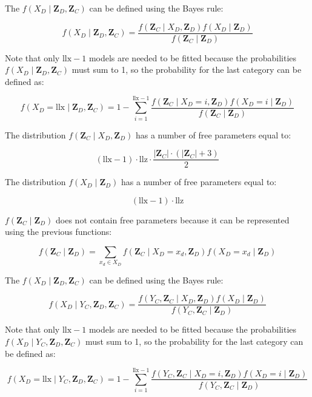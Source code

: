 \documentclass[12pt]{article}
\newcommand{\zd}{\mathbf{Z}_D}
\newcommand{\zc}{\mathbf{Z}_C}
\newcommand{\z}{\mathbf{Z}_D, \mathbf{Z}_C}
\begin{document}
The $f(X_D\mid \z)$ can be defined using the Bayes rule:

\begin{equation}
f(X_D\mid\z) = \frac{f(\zc\mid X_D, \zd)f(X_D\mid \zd)}{f(\zc\mid\zd)}
\end{equation}

Note that only $\text{llx} - 1$ models are needed to be fitted because the probabilities $f(X_D \mid \z)$ must sum to 1, so the probability for the last category can be defined as:

\begin{equation}
f(X_D = \text{llx}\mid \z) = 1 - \sum\limits_{i = 1}^{\text{llx} - 1}\frac{f(\zc \mid X_D = i, \zd) f(X_D = i \mid \zd)}{f(\zc \mid\zd)}
\end{equation}

The distribution $f(\zc\mid X_D, \zd)$ has a number of free parameters equal to:

\begin{equation}
(\text{llx} - 1)\cdot\text{llz}\cdot\frac{\lvert\zc\rvert\cdot(\lvert\zc\rvert + 3)}{2}
\end{equation}

The distribution $f(X_D\mid \zd)$ has a number of free parameters equal to:

\begin{equation}
(\text{llx} - 1)\cdot\text{llz}
\end{equation}

$f(\zc \mid\zd)$ does not contain free parameters because it can be represented using the previous functions:

\begin{equation}
f(\zc \mid \zd) = \sum\limits_{x_d \in X_D} f(\zc \mid X_D = x_d, \zd) f(X_D = x_d \mid \zd)
\end{equation}


The $f(X_D\mid \z)$ can be defined using the Bayes rule:

\begin{equation}
f(X_D\mid Y_C, \z) = \frac{f(Y_C, \zc\mid X_D, \zd)f(X_D\mid \zd)}{f(Y_C, \zc\mid\zd)}
\end{equation}


Note that only $\text{llx} - 1$ models are needed to be fitted because the probabilities $f(X_D \mid Y_C, \z)$ must sum to 1, so the probability for the last category can be defined as:

\begin{equation}
f(X_D = \text{llx}\mid Y_C, \z) = 1 - \sum\limits_{i = 1}^{\text{llx} - 1}\frac{f(Y_C, \zc \mid X_D = i, \zd) f(X_D = i \mid \zd)}{f(Y_C,\zc \mid\zd)}
\end{equation}
\end{document}
